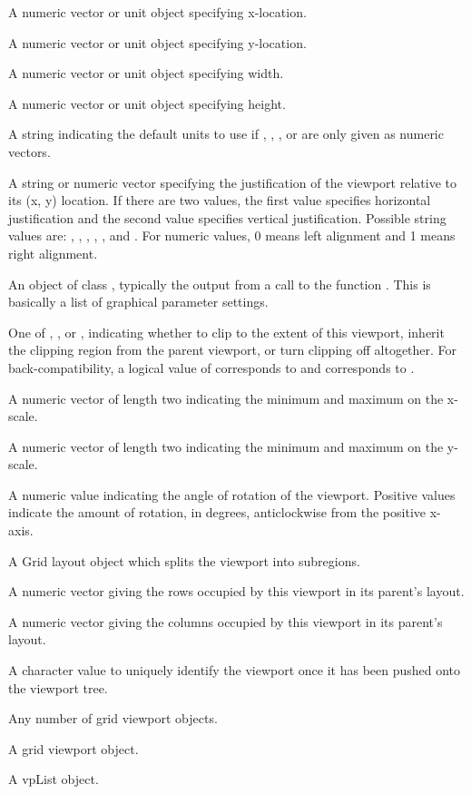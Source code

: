 \begin{Arguments}
\begin{ldescription}
\item[\code{x}] A numeric vector or unit object specifying x-location.
\item[\code{y}] A numeric vector or unit object specifying y-location.
\item[\code{width}] A numeric vector or unit object specifying width.
\item[\code{height}] A numeric vector or unit object specifying height.
\item[\code{default.units}] A string indicating the default units to use
if , , , or 
are only given as numeric vectors. 
\item[\code{just}] A string or numeric
vector specifying the justification of the viewport
relative to its (x, y) location.  If there are two values, the first
value specifies horizontal justification and the second value specifies
vertical justification.  Possible string values are: ,
, , , ,
and .  For numeric values, 0 means left alignment
and 1 means right alignment.

\item[\code{gp}] An object of class , typically the output
from a call to the function .  This is basically
a list of graphical parameter settings.
\item[\code{clip}] One of , , or
, indicating whether to
clip to the extent of this viewport, inherit the clipping region
from the parent viewport, or turn clipping off altogether.
For back-compatibility, a logical value of  corresponds
to  and  corresponds to .
\item[\code{xscale}] A numeric vector of length two indicating the minimum and
maximum on the x-scale.
\item[\code{yscale}] A numeric vector of length two indicating the minimum
and maximum on the y-scale.
\item[\code{angle}] A numeric value indicating the angle of rotation of the
viewport.  Positive values indicate the amount of rotation, in
degrees, anticlockwise from the positive x-axis.
\item[\code{layout}] A Grid layout object which splits the viewport into
subregions.
\item[\code{layout.pos.row}] A numeric vector giving the
rows occupied by this viewport in its
parent's layout.
\item[\code{layout.pos.col}] A numeric vector giving the
columns occupied by this viewport in its
parent's layout.
\item[\code{name}] A character value to uniquely identify the viewport
once it has been pushed onto the viewport tree.  
\item[\code{...}] Any number of grid viewport objects.
\item[\code{parent}] A grid viewport object.
\item[\code{children}] A vpList object.
\end{ldescription}
\end{Arguments}
